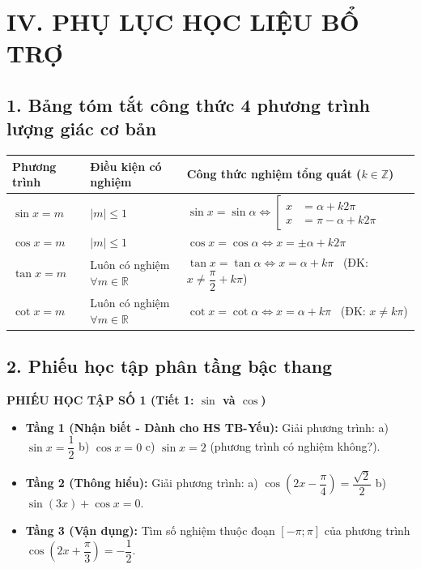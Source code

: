 \documentclass[12pt, a4paper]{article}
\begin{document}
\section*{IV. PHỤ LỤC HỌC LIỆU BỔ TRỢ}  
  
\subsection*{1. Bảng tóm tắt công thức 4 phương trình lượng giác cơ bản}  
  
\begin{center}  
\small  
\begin{tabularx}{\textwidth}{|l|l|X|}  
\hline  
\textbf{Phương trình} & \textbf{Điều kiện có nghiệm} & \textbf{Công thức nghiệm tổng quát} ($k \in \mathbb{Z}$) \\ \hline  
$\sin x = m$ & $|m| \le 1$ & $\sin x = \sin\alpha \iff \left[\begin{aligned} x &= \alpha + k2\pi \\ x &= \pi - \alpha + k2\pi \end{aligned}\right.$ \\ \hline  
$\cos x = m$ & $|m| \le 1$ & $\cos x = \cos\alpha \iff x = \pm\alpha + k2\pi$ \\ \hline  
$\tan x = m$ & Luôn có nghiệm $\forall m \in \mathbb{R}$ & $\tan x = \tan\alpha \iff x = \alpha + k\pi$ \ (ĐK: $x \neq \dfrac{\pi}{2} + k\pi$) \\ \hline  
$\cot x = m$ & Luôn có nghiệm $\forall m \in \mathbb{R}$ & $\cot x = \cot\alpha \iff x = \alpha + k\pi$ \ (ĐK: $x \neq k\pi$) \\ \hline  
\end{tabularx}  
\end{center}  
  
\subsection*{2. Phiếu học tập phân tầng bậc thang}  
  
\noindent \textbf{PHIẾU HỌC TẬP SỐ 1 (Tiết 1: $\sin$ và $\cos$)}  
\begin{itemize}[leftmargin=0.6cm]  
    \item \textbf{Tầng 1 (Nhận biết - Dành cho HS TB-Yếu):}  
    Giải phương trình: a) $\sin x = \dfrac{1}{2}$ \qquad b) $\cos x = 0$ \qquad c) $\sin x = 2$ (phương trình có nghiệm không?).  
    \item \textbf{Tầng 2 (Thông hiểu):}  
    Giải phương trình: a) $\cos\left(2x - \dfrac{\pi}{4}\right) = \dfrac{\sqrt{2}}{2}$ \qquad b) $\sin(3x) + \cos x = 0$.  
    \item \textbf{Tầng 3 (Vận dụng):}  
    Tìm số nghiệm thuộc đoạn $[-\pi; \pi]$ của phương trình $\cos\left(2x + \dfrac{\pi}{3}\right) = -\dfrac{1}{2}$.  
\end{itemize}  
  
\end{document}
